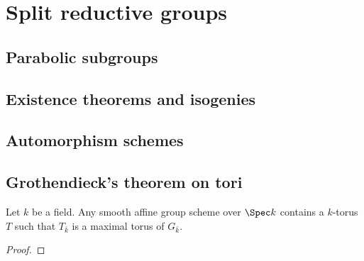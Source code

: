 \section{Split reductive groups}
    \subsection{Parabolic subgroups}
    
    \subsection{Existence theorems and isogenies}
    
    \subsection{Automorphism schemes}
    
    \subsection{Grothendieck's theorem on tori}
        \begin{theorem} \label{theorem: grothendieck_theorem_on_tori}
            Let $k$ be a field. Any smooth affine group scheme over $\Spec k$ contains a $k$-torus $T$ such that $T_{\bar{k}}$ is a maximal torus of $G_{\bar{k}}$.
        \end{theorem}
            \begin{proof}
            
            \end{proof}